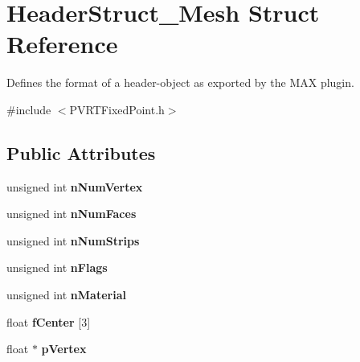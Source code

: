 \hypertarget{struct_header_struct___mesh}{\section{Header\+Struct\+\_\+\+Mesh Struct Reference}
\label{struct_header_struct___mesh}
}


Defines the format of a header-\/object as exported by the M\+A\+X plugin.  




{\ttfamily \#include $<$P\+V\+R\+T\+Fixed\+Point.\+h$>$}

\subsection*{Public Attributes}
\begin{DoxyCompactItemize}
\item 
\hypertarget{struct_header_struct___mesh_ad3e3f9ef0f6c1c4ebe76a06cba879375}{unsigned int {\bfseries n\+Num\+Vertex}}\label{struct_header_struct___mesh_ad3e3f9ef0f6c1c4ebe76a06cba879375}

\item 
\hypertarget{struct_header_struct___mesh_a57e4d237e27e74871de7eaed91a90e51}{unsigned int {\bfseries n\+Num\+Faces}}\label{struct_header_struct___mesh_a57e4d237e27e74871de7eaed91a90e51}

\item 
\hypertarget{struct_header_struct___mesh_ae8cb0c7e410d6d1d48c4715d01f700bc}{unsigned int {\bfseries n\+Num\+Strips}}\label{struct_header_struct___mesh_ae8cb0c7e410d6d1d48c4715d01f700bc}

\item 
\hypertarget{struct_header_struct___mesh_abee061b6211662926e9fa20c919fc963}{unsigned int {\bfseries n\+Flags}}\label{struct_header_struct___mesh_abee061b6211662926e9fa20c919fc963}

\item 
\hypertarget{struct_header_struct___mesh_aa05000c27852317c04ef482d3199d2f2}{unsigned int {\bfseries n\+Material}}\label{struct_header_struct___mesh_aa05000c27852317c04ef482d3199d2f2}

\item 
\hypertarget{struct_header_struct___mesh_a37e4935f854e0e7d5d529e1d50065eb8}{float {\bfseries f\+Center} \mbox{[}3\mbox{]}}\label{struct_header_struct___mesh_a37e4935f854e0e7d5d529e1d50065eb8}

\item 
\hypertarget{struct_header_struct___mesh_a453b5a8dcf37f245ad5736c6c217215f}{float $\ast$ {\bfseries p\+Vertex}}\label{struct_header_struct___mesh_a453b5a8dcf37f245ad5736c6c217215f}


\end{DoxyCompactItemize}
